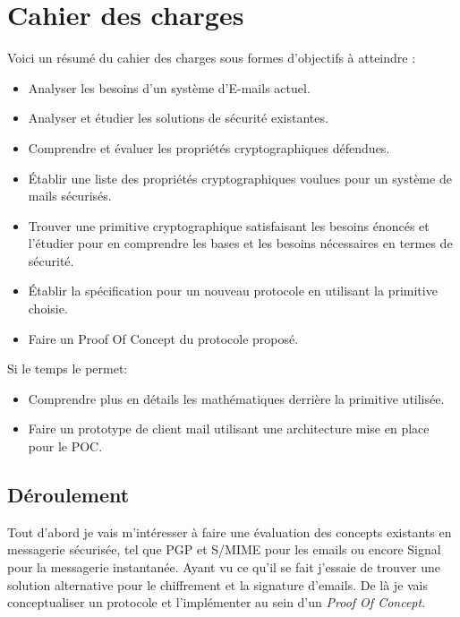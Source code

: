 \section*{Cahier des charges}
Voici un résumé du cahier des charges sous formes d'objectifs à atteindre :
\begin{itemize}
	\item Analyser les besoins d’un système d’E-mails actuel.
	\item Analyser et étudier les solutions de sécurité existantes.
	\item Comprendre et évaluer les propriétés cryptographiques défendues.
	\item Établir une liste des propriétés cryptographiques voulues pour un système de mails sécurisés.
	\item Trouver une primitive cryptographique satisfaisant les besoins énoncés et l’étudier pour en comprendre les bases et les besoins nécessaires en termes de sécurité.
	\item Établir la spécification pour un nouveau protocole en utilisant la primitive choisie.
	\item Faire un Proof Of Concept du protocole proposé.
\end{itemize}
Si le temps le permet: 
\begin{itemize}
	\item Comprendre plus en détails les mathématiques derrière la primitive utilisée.
	\item Faire un prototype de client mail utilisant une architecture mise en place pour le POC.
\end{itemize}


\subsection*{Déroulement}
Tout d'abord je vais m'intéresser à faire une évaluation des concepts existants en messagerie sécurisée, tel que PGP et S/MIME pour les emails ou encore Signal pour la messagerie instantanée. Ayant vu ce qu'il se fait j'essaie de trouver une solution alternative pour le chiffrement et la signature d'emails. De là je vais conceptualiser un protocole et l'implémenter au sein d'un \textit{Proof Of Concept}.

